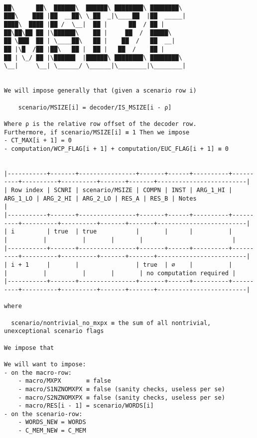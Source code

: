 \documentclass[varwidth=\maxdimen,margin=0.5cm,multi={verbatim}]{standalone}
\begin{document}
\begin{verbatim}

██\      ██\  ██████\  ██████\ ████████\ ████████\
███\    ███ |██  __██\ \_██  _|\____██  |██  _____|
████\  ████ |██ /  \__|  ██ |      ██  / ██ |
██\██\██ ██ |\██████\    ██ |     ██  /  █████\
██ \███  ██ | \____██\   ██ |    ██  /   ██  __|
██ |\█  /██ |██\   ██ |  ██ |   ██  /    ██ |
██ | \_/ ██ |\██████  |██████\ ████████\ ████████\
\__|     \__| \______/ \______|\________|\________|


We will impose generally that (given a scenario row i)

	scenario/MSIZE[i] = decoder/IS_MSIZE[i - ρ]

Where ρ is the relative row offset of the decoder row.
Furthermore, if scenario/MSIZE[i] ≡ 1 Then we impose
- CT_MAX[i + 1] = 0
- computation/WCP_FLAG[i + 1] + computation/EUC_FLAG[i + 1] ≡ 0


|-----------+-------+----------------+-------+------+----------+----------+----------+----------+-------+-------+-------------------------|
| Row index | SCNRI | scenario/MSIZE | COMPN | INST | ARG_1_HI | ARG_1_LO | ARG_2_HI | ARG_2_LO | RES_A | RES_B | Notes                   |
|-----------+-------+----------------+-------+------+----------+----------+----------+----------+-------+-------+-------------------------|
| i         | true  | true           |       |      |          |          |          |          |       |       |                         |
|-----------+-------+----------------+-------+------+----------+----------+----------+----------+-------+-------+-------------------------|
| i + 1     |       |                | true  | ∅    |          |          |          |          |       |       | no computation required |
|-----------+-------+----------------+-------+------+----------+----------+----------+----------+-------+-------+-------------------------|

where 

  scenario/nontrivial_no_mxpx ≡ the sum of all nontrivial, unexceptional scenario flags

We impose that

We will want to impose:
- on the macro-row:
	- macro/MXPX       ≡ false
	- macro/S1NZNOMXPX ≡ false (sanity checks, useless per se)
	- macro/S2NZNOMXPX ≡ false (sanity checks, useless per se)
	- macro/RES[i - 1] = scenario/WORDS[i]
- on the scenario-row:
	- WORDS_NEW = WORDS
	- C_MEM_NEW = C_MEM

\end{verbatim}
\end{document}
